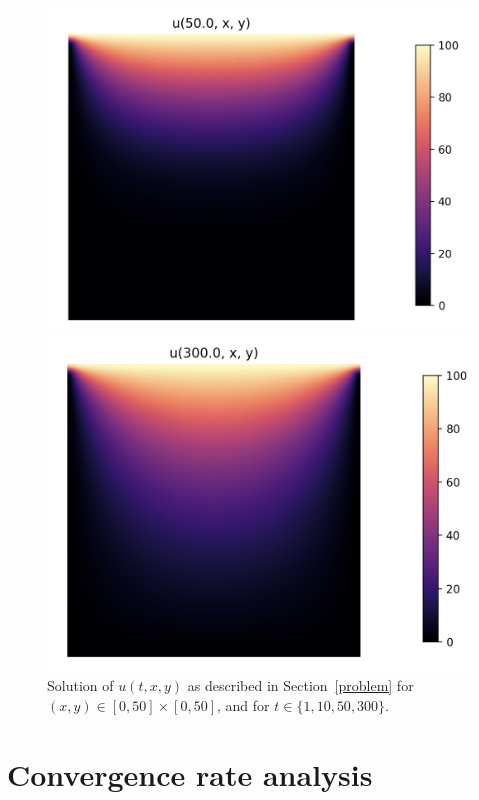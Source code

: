 \documentclass{article}
\begin{document}
\begin{figure}[h!]
\begin{minipage}[b]{0.50\linewidth}
\end{minipage} 
\begin{minipage}[b]{0.50\linewidth}
	\centering
	\includegraphics[width=0.95\linewidth]{img/50._diff.png}
\end{minipage}
\hfill 
\begin{minipage}[b]{0.50\linewidth}
	\centering\includegraphics[width=0.95\linewidth]{img/300._diff.png} 
\end{minipage} 
\caption{Solution of $u(t, x, y)$ as described in Section~\ref{problem} for $(x, y) \in [0, 50] \times [0, 50]$, and for $t \in \{1, 10, 50, 300\}$.}
\label{sol} 
\end{figure}

\section{Convergence rate analysis}
\end{document}
